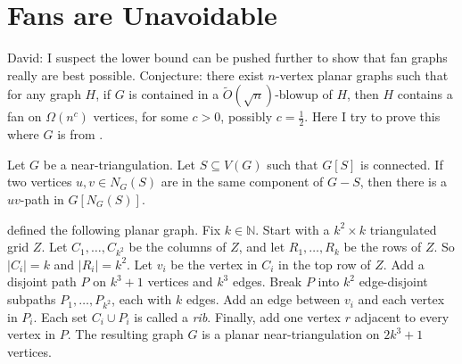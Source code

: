 \documentclass{patmorin}
\newcommand{\david}[1]{{\color{orange} David: #1}}
\newcommand{\defin}[1]{\emph{\textcolor{brightmaroon}{#1}}}
\begin{document}

\section{Fans are Unavoidable}
\david{I suspect the lower bound can be pushed further to show  that fan graphs really are best possible. Conjecture: there exist $n$-vertex planar graphs such that for any graph $H$, if $G$ is contained in  a $\tilde{O}(\sqrt{n})$-blowup of $H$, then $H$ contains a fan on $\Omega(n^c)$ vertices, for some $c>0$, possibly $c=\frac12$. Here I try to prove this where $G$ is from \citep{LMST08}. }

\begin{lem}
\label{FindPath}
Let $G$ be a near-triangulation. Let $S\subseteq V(G)$ such that $G[S]$ is connected. If two vertices $u,v\in N_G(S)$ are in the same component of $G-S$, then there is a $uv$-path in $G[ N_G(S) ]$.
\end{lem}

\citet{LMST08} defined the following planar graph. Fix $k\in\mathbb{N}$. Start with a $k^2 \times k$ triangulated grid $Z$. Let $C_1,\dots,C_{k^2}$ be the columns of $Z$, and let $R_1,\dots,R_k$ be the rows of $Z$. So $|C_i|=k$ and $|R_i|=k^2$. Let $v_i$ be the vertex in $C_i$ in the top row of $Z$. Add a disjoint path $P$ on $k^3+1$ vertices and $k^3$ edges. Break $P$ into $k^2$ edge-disjoint subpaths $P_1,\dots,P_{k^2}$, each with $k$ edges. Add an edge between $v_i$ and each vertex in $P_i$.
Each set $C_i\cup P_i$ is called a \defin{rib}. Finally, add one vertex $r$ adjacent to every vertex in $P$. The resulting graph $G$ is a planar near-triangulation on $2k^3+1$ vertices.
\end{document}

